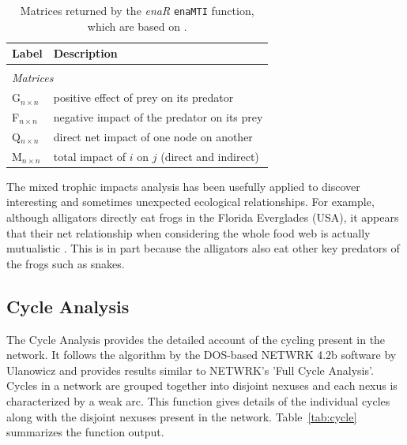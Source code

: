 \documentclass[article]{jss}
\begin{document}
\begin{table}[t]
  \caption{Matrices returned by the \textit{enaR}    %
    \texttt{enaMTI} function, which are based on \citep{ulanowicz90}.}\label{tab:mti}
  \center
  \begin{small}
    \begin{tabular}{l l}
      \textbf{Label} & \textbf{Description} \\ \hline \\[-1.5ex]
      \multicolumn{2}{l}{\textit{Matrices}} \\[1ex]
      G$_{n \times n}$ & positive effect of prey on its predator \\  %
      F$_{n \times n}$ & negative impact of the predator on its prey \\
      Q$_{n \times n}$ & direct net impact of one node on another\\
      M$_{n \times n}$ & total impact of $i$ on $j$ (direct and indirect) \\ \hline
\end{tabular}
\end{small}
\end{table}

The mixed trophic impacts analysis has been usefully applied to
discover interesting and sometimes unexpected ecological
relationships.  For example, although alligators directly eat frogs in
the Florida Everglades (USA), it appears that their net relationship
when considering the whole food web is actually mutualistic
\cite{bondavalli99}.  This is in part because the alligators also eat
other key predators of the frogs such as snakes.


\subsection{Cycle Analysis}
The Cycle Analysis provides the detailed account of the cycling
present in the network. It follows the algorithm by the DOS-based
NETWRK 4.2b software by Ulanowicz \citep{ulanowicz91, ulanowicz83} and
provides results similar to NETWRK's 'Full Cycle Analysis'.  Cycles in
a network are grouped together into disjoint nexuses and each nexus is
characterized by a weak arc. This function gives details of the
individual cycles along with the disjoint nexuses present in the
network.  Table~\ref{tab:cycle} summarizes the function output.

\end{document}

